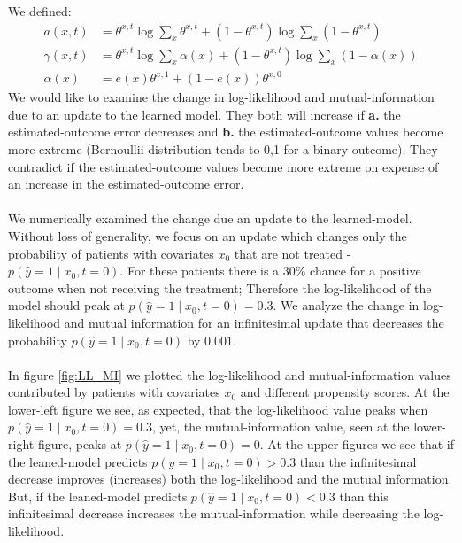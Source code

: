 \documentclass[oneside,12pt]{article}
\begin{document}
%
We defined:
\begin{equation}
    \begin{split}
        a(x,t) &= \theta^{x,t}\operatorname{log} \sum_x \theta^{x,t} + (1-\theta^{x,t})\operatorname{log} \sum_x (1-\theta^{x,t})\\
        \gamma(x,t) &= \theta^{x,t}\operatorname{log}\sum_x \alpha(x)
        + (1-\theta^{x,t})\operatorname{log}\sum_x (1 - \alpha(x))\\
        \alpha(x) &= e(x)\theta^{x,1} + (1-e(x))\theta^{x,0}
    \end{split}
\end{equation}
%
We would like to examine the change in log-likelihood and mutual-information due to an update to the learned model. They both will increase if \textbf{a.} the estimated-outcome error decreases and \textbf{b.} the estimated-outcome values become more extreme (Bernoullii distribution tends to 0,1 for a binary outcome). They contradict if the estimated-outcome values become more extreme on expense of an increase in the estimated-outcome error.\\\\
%
We numerically examined the change due an update to the learned-model. Without loss of generality, we focus on an update which changes only the probability of patients with covariates $x_0$ that are not treated - $p(\hat{y} = 1 \mid x_0, t=0)$. For these patients there is a 30\% chance for a positive outcome when not receiving the treatment; Therefore the log-likelihood of the model should peak at $p(\hat{y} = 1 \mid x_0, t=0) = 0.3$. We analyze the change in log-likelihood and mutual information for an infinitesimal update that decreases the probability $p(\hat{y} = 1 \mid x_0, t=0)$ by $0.001$.\\\\
%
In figure \ref{fig:LL_MI} we plotted the log-likelihood and mutual-information values contributed by patients with covariates $x_0$ and different propensity scores. At the lower-left figure we see, as expected, that the log-likelihood value peaks when $p(\hat{y} = 1 \mid x_0, t=0) = 0.3$, yet, the mutual-information value, seen at the lower-right figure, peaks at $p(\hat{y} = 1 \mid x_0, t=0) = 0$. At the upper figures we see that if the leaned-model predicts $p(\hat{y} = 1 \mid x_0, t=0) > 0.3$ than the infinitesimal decrease improves (increases) both the log-likelihood and the mutual information. But, if the leaned-model predicts $p(\hat{y} = 1 \mid x_0, t=0) < 0.3$ than this infinitesimal decrease increases the mutual-information while decreasing the log-likelihood.\\\\
\end{document}

